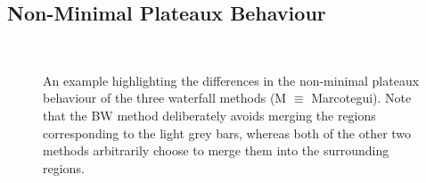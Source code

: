 \documentclass[preprint,a4paper]{elsarticle}
\newenvironment{stusubfig}[1]
{
	\begin{figure}[#1]
	\begin{center}
}
{
	\end{center}
	\end{figure}
}
\begin{document}
\subsection{Non-Minimal Plateaux Behaviour}
\label{subsec:experiments-plateaux}

\begin{stusubfig}{!t}
	\hspace{4mm}%
	\\
	\hspace{4mm}%
\caption{An example highlighting the differences in the non-minimal plateaux behaviour of the three waterfall methods (M $\equiv$ Marcotegui). Note that the BW method deliberately avoids merging the regions corresponding to the light grey bars, whereas both of the other two methods arbitrarily choose to merge them into the surrounding regions.}
\label{fig:plateaux-behaviour}
\end{stusubfig}
\end{document}
